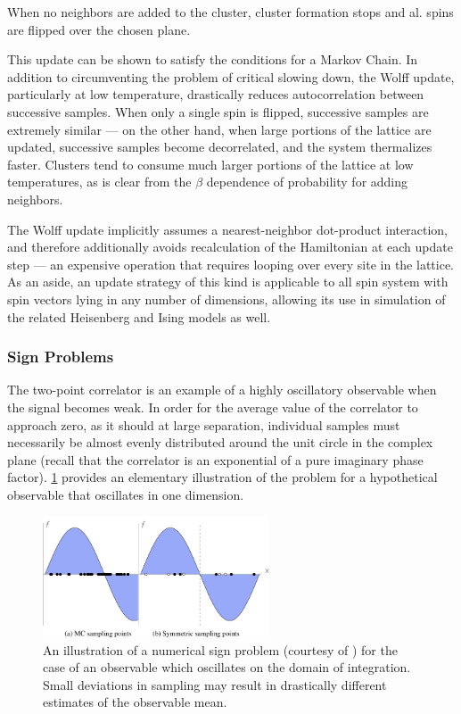 \documentclass[12pt]{article}
\begin{document}
When no neighbors are added to the cluster, cluster formation stops and al. spins are flipped over the chosen plane.

This update can be shown to satisfy the conditions for a Markov Chain. In addition to circumventing the problem of critical slowing down, the Wolff update, particularly
at low temperature, drastically reduces autocorrelation between successive samples. When only a single spin is flipped, successive samples are extremely similar --- on the other hand, when large portions of the lattice are updated, successive samples become decorrelated, and the
system thermalizes faster. Clusters tend to consume much larger portions of the lattice at low temperatures, as is clear from the $\beta$ dependence of probability for 
adding neighbors.

The Wolff update implicitly assumes a nearest-neighbor dot-product interaction, and therefore additionally avoids recalculation of the Hamiltonian at each update step ---
an expensive operation that requires looping over every site in the lattice. As an aside, an update strategy of this kind is applicable to all spin system with spin vectors
lying in any number of dimensions, allowing its use in simulation of the related Heisenberg and Ising models as well.

\subsubsection{Sign Problems}

The two-point correlator is an example of a highly oscillatory observable when the signal becomes weak. In order for the average value of the correlator to approach zero, 
as it should at large separation, individual samples must necessarily be almost evenly distributed around the unit circle in the complex plane (recall that the correlator 
is an exponential of a pure imaginary phase factor). \ref{fig:sign_problem} provides an elementary illustration of the problem for a hypothetical observable that oscillates 
in one dimension.

\begin{figure}[h]
	\centering
	\includegraphics[width=0.6\textwidth]{figures/sign.png}
	\caption{An illustration of a numerical sign problem (courtesy of \cite{10.1007/978-3-030-43465-6_11}) for the case of an observable
	which oscillates on the domain of integration. Small deviations in sampling may result in drastically different estimates
	of the observable mean.}
	\label{fig:sign_problem}
\end{figure}
\end{document}
